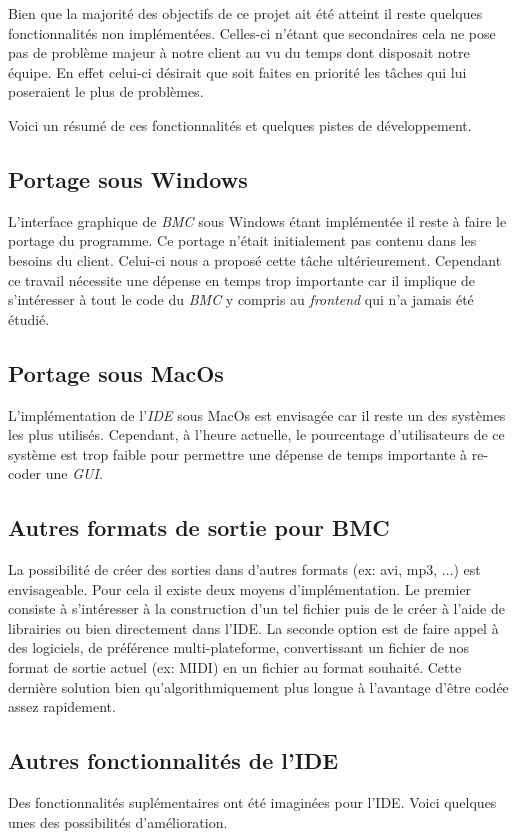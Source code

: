 
Bien que la majorité des objectifs de ce projet ait été atteint il
reste quelques fonctionnalités non implémentées. Celles-ci n'étant
que secondaires cela ne pose pas de problème majeur à notre client au
vu du temps dont disposait notre équipe. En effet celui-ci désirait
que soit faites en priorité les tâches qui lui poseraient le plus de
problèmes.

Voici un résumé de ces fonctionnalités et quelques pistes de
développement.

 
\subsection{Portage sous Windows}
L'interface graphique de \textit{BMC} sous Windows étant implémentée
il reste à faire le portage du programme. Ce portage n'était
initialement pas contenu dans les besoins du client. Celui-ci nous a
proposé cette tâche ultérieurement. Cependant ce travail nécessite une
dépense en temps trop importante car il implique de s'intéresser à
tout le code du \textit{BMC} y compris au \textit{frontend} qui n'a jamais
été étudié.


\subsection{Portage sous MacOs}
L'implémentation de l'\textit{IDE} sous MacOs est envisagée car il
reste un des systèmes les plus utilisés. Cependant, à l'heure
actuelle, le pourcentage d'utilisateurs de ce système est trop faible
pour permettre une dépense de temps importante à re-coder une
\textit{GUI}.

\subsection{Autres formats de sortie pour BMC}
La possibilité de créer des sorties dans d'autres formats (ex: avi,
mp3, ...) est envisageable. Pour cela il existe deux moyens
d'implémentation. Le premier consiste à s'intéresser à la construction
d'un tel fichier puis de le créer à l'aide de librairies ou bien
directement dans l'IDE. La seconde option est de faire appel à des
logiciels, de préférence multi-plateforme, convertissant un fichier de
nos format de sortie actuel (ex: MIDI) en un fichier au format
souhaité. Cette dernière solution bien qu'algorithmiquement plus
longue à l'avantage d'être codée assez rapidement.


\subsection{Autres fonctionnalités de l'IDE}
Des fonctionnalités suplémentaires ont été imaginées pour
l'IDE. Voici quelques unes des possibilités d'amélioration.

